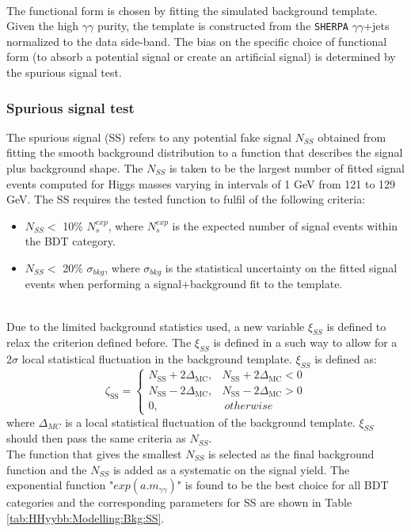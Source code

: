 \\
The functional form is chosen by fitting the simulated background template. Given the high $\gamma\gamma$ purity, the template is constructed from the \texttt{SHERPA} $\gamma\gamma$+jets normalized to the data side-band. The bias on the specific choice of functional form (to absorb a potential signal or create an artificial signal) is determined by the spurious signal test. 

\subsubsection{Spurious signal test}
\label{HHyybb:Modelling:Bkg:SS}
The spurious signal (SS) refers to any potential fake signal $N_{SS}$ obtained from fitting the smooth background distribution to a function that describes the signal plus background shape. The $N_{SS}$ is taken to be the largest number of fitted signal events computed for Higgs masses varying in intervals of 1 GeV from 121 to 129 GeV. The SS requires the tested function to fulfil of the following criteria: 
\begin{itemize}
    \item $N_{SS} < $ 10\% $N_{s}^{exp}$, where $N_{s}^{exp}$ is the expected number of signal events within the BDT category. 
    \item $N_{SS} < $ 20\% $\sigma_{bkg}$, where $\sigma_{bkg}$ is the statistical uncertainty on the fitted signal events when performing a signal+background fit to the template. 
\end{itemize}
\\
Due to the limited background statistics used, a new variable $\xi_{SS}$ is defined to relax the criterion defined before. The $\xi_{SS}$ is defined in a such way to allow for a 2$\sigma$ local statistical fluctuation in the background template. $\xi_{SS}$ is defined as: 
\begin{equation}
    \zeta_{\mathrm{SS}}=\left\{\begin{array}{ll}
N_{\mathrm{SS}}+2 \Delta_{\mathrm{MC}}, & N_{\mathrm{SS}}+2 \Delta_{\mathrm{MC}}<0 \\
N_{\mathrm{SS}}-2 \Delta_{\mathrm{MC}}, & N_{\mathrm{SS}}-2 \Delta_{\mathrm{MC}}>0 \\
0, & \  otherwise 
\end{array}\right.
\end{equation}
where $\Delta_{MC}$ is a local statistical fluctuation of the background template. $\xi_{SS}$ should then pass the same criteria as $N_{SS}$. \\
The function that gives the smallest $N_{SS}$ is selected as the final background function and the $N_{SS}$ is added as a systematic on the signal yield. The exponential function "$exp(a.m_{\gamma\gamma})$" is found to be the best choice for all BDT categories and the corresponding parameters for SS are shown in Table \ref{tab:HHyybb:Modelling:Bkg:SS}.

